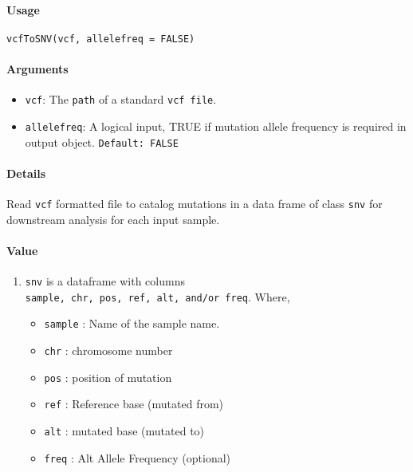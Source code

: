 \documentclass[]{article}
\providecommand{\tightlist}{%
  \setlength{\itemsep}{0pt}\setlength{\parskip}{0pt}}
\let\oldparagraph\paragraph
\renewcommand{\paragraph}[1]{\oldparagraph{#1}\mbox{}}
\begin{document}
\paragraph{\texorpdfstring{\textbf{Usage}}{Usage}}\label{usage}

\texttt{vcfToSNV(vcf,\ allelefreq\ =\ FALSE)}

\paragraph{\texorpdfstring{\textbf{Arguments
}}{Arguments }}\label{arguments}

\begin{itemize}
\tightlist
\item
  \texttt{vcf}: The \texttt{path} of a standard \texttt{vcf\ file}.
\item
  \texttt{allelefreq}: A logical input, TRUE if mutation allele
  frequency is required in output object. \texttt{Default:\ FALSE}
\end{itemize}

\paragraph{\texorpdfstring{\textbf{Details}}{Details}}\label{details}

Read \texttt{vcf} formatted file to catalog mutations in a data frame of class
\texttt{snv} for downstream analysis for each input sample.

\hypertarget{snv}{\paragraph{\texorpdfstring{\textbf{Value}}{Value}}\label{snv}}

\begin{enumerate}
\def\labelenumi{\arabic{enumi}.}
\tightlist
\item
  \texttt{snv} is a dataframe with columns
  \texttt{sample,\ chr,\ pos,\ ref,\ alt,\ and/or\ freq}. Where,

  \begin{itemize}
  \tightlist
  \item
    \texttt{sample} : Name of the sample name.
  \item
    \texttt{chr} : chromosome number
  \item
    \texttt{pos} : position of mutation
  \item
    \texttt{ref} : Reference base (mutated from)
  \item
    \texttt{alt} : mutated base (mutated to)
  \item
    \texttt{freq} : Alt Allele Frequency (optional)
  \end{itemize}
\end{enumerate}
\end{document}
